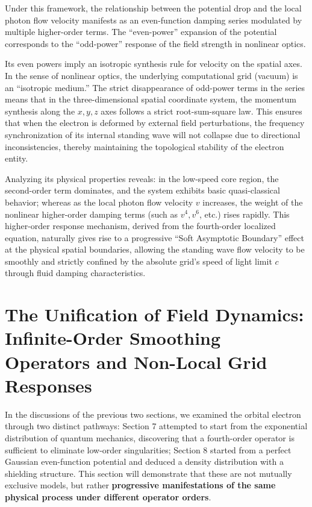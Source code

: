 \documentclass[12pt, a4paper]{article}
\begin{document}
Under this framework, the relationship between the potential drop and the local photon flow velocity manifests as an even-function damping series modulated by multiple higher-order terms. The ``even-power'' expansion of the potential corresponds to the ``odd-power'' response of the field strength in nonlinear optics.

Its even powers imply an isotropic synthesis rule for velocity on the spatial axes. In the sense of nonlinear optics, the underlying computational grid (vacuum) is an ``isotropic medium.'' The strict disappearance of odd-power terms in the series means that in the three-dimensional spatial coordinate system, the momentum synthesis along the $x, y, z$ axes follows a strict root-sum-square law. This ensures that when the electron is deformed by external field perturbations, the frequency synchronization of its internal standing wave will not collapse due to directional inconsistencies, thereby maintaining the topological stability of the electron entity.

Analyzing its physical properties reveals: in the low-speed core region, the second-order term dominates, and the system exhibits basic quasi-classical behavior; whereas as the local photon flow velocity $v$ increases, the weight of the nonlinear higher-order damping terms (such as $v^4, v^6$, etc.) rises rapidly. This higher-order response mechanism, derived from the fourth-order localized equation, naturally gives rise to a progressive ``Soft Asymptotic Boundary'' effect at the physical spatial boundaries, allowing the standing wave flow velocity to be smoothly and strictly confined by the absolute grid's speed of light limit $c$ through fluid damping characteristics.



\section{The Unification of Field Dynamics: Infinite-Order Smoothing Operators and Non-Local Grid Responses}

In the discussions of the previous two sections, we examined the orbital electron through two distinct pathways: Section 7 attempted to start from the exponential distribution of quantum mechanics, discovering that a fourth-order operator is sufficient to eliminate low-order singularities; Section 8 started from a perfect Gaussian even-function potential and deduced a density distribution with a shielding structure. This section will demonstrate that these are not mutually exclusive models, but rather \textbf{progressive manifestations of the same physical process under different operator orders}.
\end{document}
